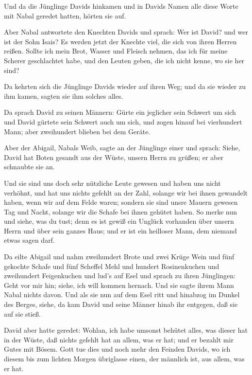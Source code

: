  Und da die Jünglinge Davids hinkamen und in Davids Namen
alle diese Worte mit Nabal geredet hatten, hörten sie auf.

 Aber Nabal antwortete den Knechten Davids und sprach: Wer
ist David? und wer ist der Sohn Isais? Es werden jetzt der Knechte viel,
die sich von ihren Herren reißen.  Sollte ich mein Brot,
Wasser und Fleisch nehmen, das ich für meine Scherer geschlachtet habe,
und den Leuten geben, die ich nicht kenne, wo sie her sind?

 Da kehrten sich die Jünglinge Davids wieder auf ihren Weg;
und da sie wieder zu ihm kamen, sagten sie ihm solches alles.

 Da sprach David zu seinen Männern: Gürte ein jeglicher
sein Schwert um sich und David gürtete sein Schwert auch um sich, und
zogen hinauf bei vierhundert Mann; aber zweihundert blieben bei dem
Geräte.

 Aber der Abigail, Nabals Weib, sagte an der Jünglinge
einer und sprach: Siehe, David hat Boten gesandt aus der Wüste, unsern
Herrn zu grüßen; er aber schnaubte sie an.

 Und sie sind uns doch sehr nützliche Leute gewesen und
haben uns nicht verhöhnt, und hat uns nichts gefehlt an der Zahl,
solange wir bei ihnen gewandelt haben, wenn wir auf dem Felde waren;
 sondern sie sind unsre Mauern gewesen Tag und Nacht,
solange wir die Schafe bei ihnen gehütet haben.  So merke
nun und siehe, was du tust; denn es ist gewiß ein Unglück vorhanden über
unsern Herrn und über sein ganzes Haus; und er ist ein heilloser Mann,
dem niemand etwas sagen darf.

 Da eilte Abigail und nahm zweihundert Brote und zwei Krüge
Wein und fünf gekochte Schafe und fünf Scheffel Mehl und hundert
Rosinenkuchen und zweihundert Feigenkuchen und lud's auf Esel
 und sprach zu ihren Jünglingen: Geht vor mir hin; siehe,
ich will kommen hernach. Und sie sagte ihrem Mann Nabal nichts davon.
 Und als sie nun auf dem Esel ritt und hinabzog im Dunkel
des Berges, siehe, da kam David und seine Männer hinab ihr entgegen, daß
sie auf sie stieß.

 David aber hatte geredet: Wohlan, ich habe umsonst behütet
alles, was dieser hat in der Wüste, daß nichts gefehlt hat an allem, was
er hat; und er bezahlt mir Gutes mit Bösem.  Gott tue dies
und noch mehr den Feinden Davids, wo ich diesem bis zum lichten Morgen
übriglasse einen, der männlich ist, aus allem, was er hat.

